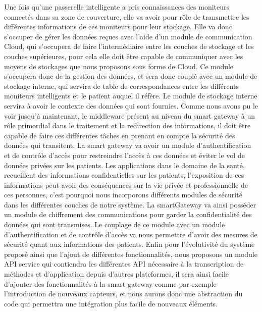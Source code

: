 Une fois qu’une passerelle intelligente a pris connaissances des moniteurs connectés dans sa zone de couverture, elle va avoir pour rôle de transmettre les différentes informations de ces moniteurs pour leur stockage. Elle va donc s’occuper de gérer les données reçues avec l’aide d’un module de communication Cloud, qui s’occupera de faire l’intermédiaire entre les couches de stockage et les couches supérieures, pour cela elle doit être capable de communiquer avec les moyens de stockages que nous proposons sous forme de Cloud. Ce module s’occupera donc de la gestion des données, et sera donc couplé avec un module de stockage interne, qui servira de table de correspondances entre les différents moniteurs intelligents et le patient auquel il réfère. Le module de stockage interne servira à avoir le contexte des données qui sont fournies.
Comme nous avons pu le voir jusqu’à maintenant, le middleware présent au niveau du smart gateway à un rôle primordial dans le traitement et la redirection des informations, il doit être capable de faire ces différentes tâches en prenant en compte la sécurité des données qui transitent. La smart gateway va avoir un module d’authentification et de contrôle d’accès pour restreindre l’accès à ces données et éviter le vol de données privées sur les patients. Les applications dans le domaine de la santé, recueillent des informations confidentielles sur les patients, l’exposition de ces informations peut avoir des conséquences sur la vie privée et professionnelle de ces personnes, c’est pourquoi nous incorporons différents modules de sécurité dans les différentes couches de notre système. La smartGateway va ainsi posséder un module de chiffrement des communications pour garder la confidentialité des données qui sont transmises. Le couplage de ce module avec un module d’authentification et de contrôle d’accès va nous permettre d’avoir des mesures de sécurité quant aux informations des patients.
Enfin pour l’évolutivité du système proposé ainsi que l’ajout de différentes fonctionnalités, nous proposons un module API service qui contiendra les différentes API nécessaire à la transcription de méthodes et d’application depuis d’autres plateformes, il sera ainsi facile d’ajouter des fonctionnalités à la smart gateway comme par exemple l’introduction de nouveaux capteurs, et nous aurons donc une abstraction du code qui permettra une intégration plus facile de nouveaux éléments.